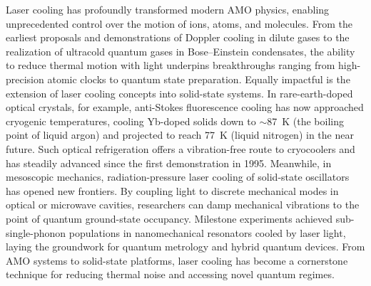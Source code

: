 Laser cooling has profoundly transformed modern \ac{AMO} physics, enabling unprecedented control over the motion of ions, atoms, and molecules. From the earliest proposals and demonstrations of Doppler cooling in dilute gases \cite{hansch1975cooling} to the realization of ultracold quantum gases in Bose–Einstein condensates\cite{anderson1995observation}, the ability to reduce thermal motion with light underpins breakthroughs ranging from high-precision atomic clocks to quantum state preparation\cite{ludlow2015optical}. Equally impactful is the extension of laser cooling concepts into solid-state systems. In rare-earth-doped optical crystals, for example, anti-Stokes fluorescence cooling has now approached cryogenic temperatures, cooling Yb-doped solids down to \(\sim\)\SI{87}{\kelvin} (the boiling point of liquid argon) and projected to reach \SI{77}{\kelvin} (liquid nitrogen) in the near future. \cite{meng2018realization} Such optical refrigeration offers a vibration-free route to cryocoolers and has steadily advanced since the first demonstration in 1995. \cite{epstein1995observation} Meanwhile, in mesoscopic mechanics, radiation-pressure laser cooling of solid-state oscillators has opened new frontiers. By coupling light to discrete mechanical modes in optical or microwave cavities, researchers can damp mechanical vibrations to the point of quantum ground-state occupancy. \cite{chan2011laser} Milestone experiments achieved sub-single-phonon populations in nanomechanical resonators cooled by laser light\cite{chan2011laser}, laying the groundwork for quantum metrology and hybrid quantum devices. From \ac{AMO} systems to solid-state platforms, laser cooling has become a cornerstone technique for reducing thermal noise and accessing novel quantum regimes.

